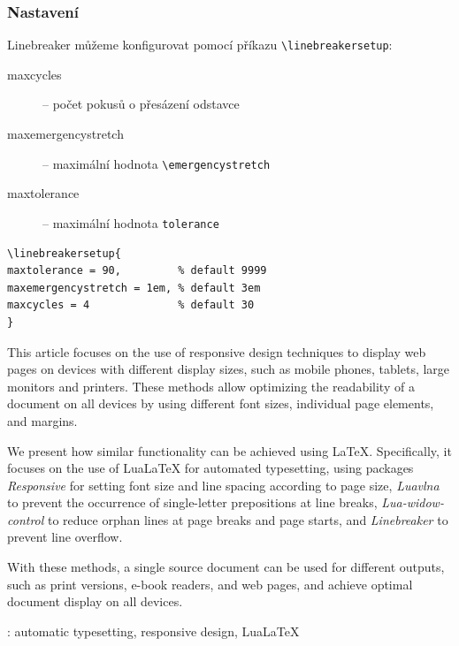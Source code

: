 \documentclass{csbulletin}
\newcommand\balicek[1]{\textit{#1}}
\begin{document}

  \subsubsection{Nastavení}

  Linebreaker můžeme konfigurovat pomocí příkazu \verb|\linebreakersetup|:
  \begin{description}
    \item[maxcycles] -- počet pokusů o přesázení odstavce
    \item[maxemergencystretch] -- maximální hodnota \verb|\emergencystretch|
    \item[maxtolerance]  -- maximální hodnota \verb|tolerance|
  \end{description}
\begin{verbatim}
\linebreakersetup{
maxtolerance = 90,         % default 9999
maxemergencystretch = 1em, % default 3em
maxcycles = 4              % default 30
}
\end{verbatim}

\printbibliography

\begin{summary}
  This article focuses on the use of responsive design techniques to display
  web pages on devices with different display sizes, such as mobile phones,
  tablets, large monitors and printers. These methods allow optimizing the
  readability of a document on all devices by using different font sizes,
  individual page elements, and margins.

  We present how similar functionality can be achieved using \LaTeX.
  Specifically, it focuses on the use of Lua\LaTeX{} for automated typesetting,
  using packages \balicek{Responsive} for setting font size and line spacing according to page size,
  \balicek{Luavlna} to prevent the occurrence of
  single-letter prepositions at line breaks, \balicek{Lua-widow-control} to
  reduce orphan lines at page breaks and page starts, and \balicek{Linebreaker}
  to prevent line overflow.

  With these methods, a single source document can be used for different
  outputs, such as print versions, e-book readers, and web pages, and achieve
  optimal document display on all devices.

\keywords: automatic typesetting, responsive design, Lua\LaTeX
\end{summary}
\end{document}
